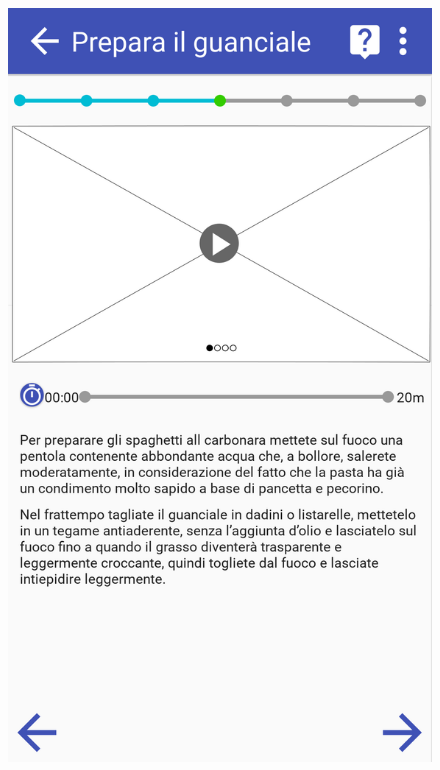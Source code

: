 \begin{figure}[H]
	\begin{minipage}{.49\textwidth}
		\includegraphics[width=\textwidth]{img/wireframe/presentazione_passo_ricetta_timer_non_attivo.png}
	\end{minipage}
	\begin{minipage}{.49\textwidth}

\end{minipage}
\end{figure}
